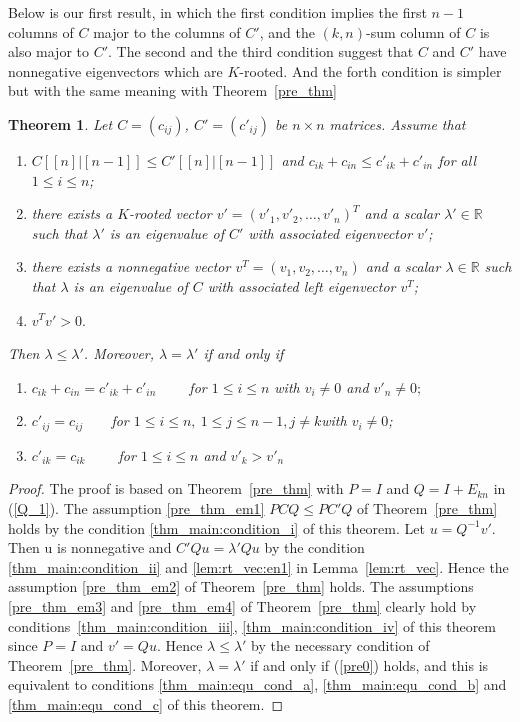 \documentclass[12pt, a4paper]{article}
\theoremstyle{plain}
\newtheorem{thm}{Theorem}[section]
\theoremstyle{definition}
\begin{document}
Below is our first result, in which the first condition implies the first $n-1$ columns of $C$ major to
 the columns of $C'$, and the $(k,n)$-sum column of $C$ is also major to $C'$. The second and the third condition
 suggest that $C$ and $C'$ have nonnegative eigenvectors which are $K$-rooted. And the forth condition is simpler
  but with the same meaning with Theorem~\ref{pre_thm}
\begin{thm}\label{thm_main}
    Let $C=(c_{ij})$, $C'=(c'_{ij})$ be  $n\times n$ matrices.
Assume that
\begin{enumerate}[label=(\roman*)]
\item \label{thm_main:condition_i} $C[[n]|[n-1]]\leq C'[[n]|[n-1]]$ and $c_{ik}+c_{in}\leq c'_{ik}+c'_{in}$ for all $1\leq i\leq n$;
\item \label{thm_main:condition_ii} there exists a $K$-rooted vector $v'=(v'_1, v'_2, \ldots, v'_n)^T$ and a scalar $\lambda'\in \mathbb{R}$
such that $\lambda'$ is an eigenvalue of $C'$ with associated eigenvector $v'$;
\item \label{thm_main:condition_iii}there exists a nonnegative vector $v^T=(v_1, v_2, \ldots, v_n)$ and a scalar $\lambda\in \mathbb{R}$ such that $\lambda$ is an eigenvalue of $C$ with associated left eigenvector $v^T$;
\item \label{thm_main:condition_iv}$v^Tv'>0.$
\end{enumerate}
 Then $\lambda\leq \lambda'$.
Moreover, $\lambda=\lambda'$
if and only if
\begin{enumerate}[label=(\alph*)]
    \item \label{thm_main:equ_cond_a} $c_{ik}+c_{in}=c'_{ik}+c'_{in} \qquad$  for $1\leq i\leq n$ with $v_i\not=0$ and $v'_n\not=0;$
    \item \label{thm_main:equ_cond_b} $c'_{ij}=c_{ij}\qquad $for $1\leq i\leq n,~1\leq j\leq n-1, j \neq k $with $v_i\ne 0 $;
    \item \label{thm_main:equ_cond_c} $c'_{ik}=c_{ik} \qquad $  for $1\leq i \leq n$ and $ v'_{k}>v'_n$
\end{enumerate} %
\end{thm}
%


\begin{proof}
    The proof is based on Theorem~\ref{pre_thm} with $P = I$ and $Q = I + E_{kn}$ in (\ref{Q_1}).
    The assumption \ref{pre_thm_em1} $PCQ\leq PC'Q$ of Theorem~\ref{pre_thm} holds by the condition \ref{thm_main:condition_i} of this theorem.
    Let $u = Q^{-1}v'$. Then u is nonnegative and $C'Qu = \lambda' Qu$ by the condition \ref{thm_main:condition_ii} and \ref{lem:rt_vec:en1} in
     Lemma~\ref{lem:rt_vec}. Hence the assumption \ref{pre_thm_em2} of Theorem~\ref{pre_thm} holds. The assumptions \ref{pre_thm_em3} and \ref{pre_thm_em4}
      of Theorem~\ref{pre_thm} clearly hold by conditions~\ref{thm_main:condition_iii}, \ref{thm_main:condition_iv} of this theorem since $P = I$ and
       $v'= Qu$. Hence $\lambda \leq \lambda' $ by the necessary condition of Theorem~\ref{pre_thm}. Moreover,
        $\lambda = \lambda'$ if and only if (\ref{pre0}) holds, and this is equivalent to
         conditions \ref{thm_main:equ_cond_a}, \ref{thm_main:equ_cond_b} and \ref{thm_main:equ_cond_c} of this theorem.
\end{proof}
\end{document}
